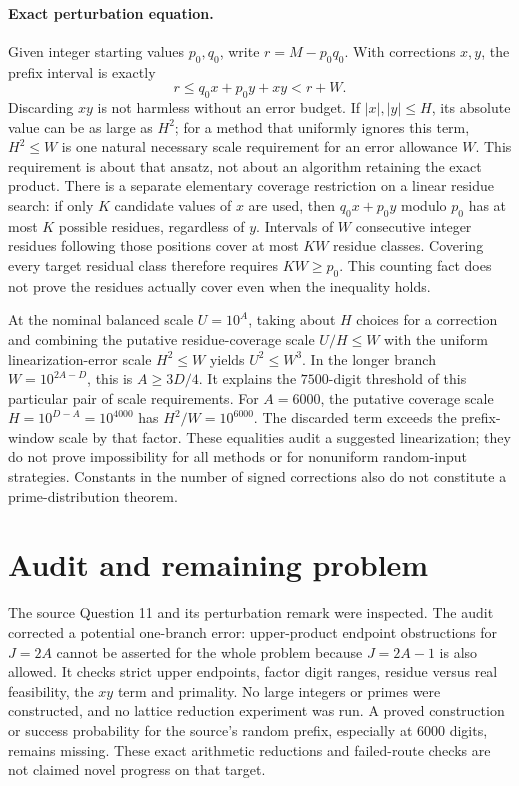 \documentclass[11pt]{article}
\begin{document}
\paragraph{Exact perturbation equation.}
Given integer starting values $p_0,q_0$, write $r=M-p_0q_0$.
With corrections $x,y$, the prefix interval is exactly
\[
r\le q_0x+p_0y+xy<r+W.
\]
Discarding $xy$ is not harmless without an error budget. If
$|x|,|y|\le H$, its absolute value can be as large as $H^2$;
for a method that uniformly ignores this term, $H^2\le W$ is one
natural necessary scale requirement for an error allowance $W$.
This requirement is about that ansatz, not about an algorithm retaining
the exact product.
There is a separate elementary coverage restriction on a linear residue
search: if only $K$ candidate values of $x$ are used, then
$q_0x+p_0y$ modulo $p_0$ has at most $K$ possible residues, regardless
of $y$. Intervals of $W$ consecutive integer residues following those
positions cover at most $KW$ residue classes. Covering every target
residual class therefore requires $KW\ge p_0$.
This counting fact does not prove the residues actually cover even
when the inequality holds.

At the nominal balanced scale $U=10^A$, taking about $H$ choices
for a correction and combining the putative residue-coverage scale
$U/H\le W$ with the uniform linearization-error scale $H^2\le W$ yields
$U^2\le W^3$. In the longer branch $W=10^{2A-D}$, this is
$A\ge3D/4$. It explains the $7500$-digit threshold of this particular
pair of scale requirements. For $A=6000$, the putative coverage scale
$H=10^{D-A}=10^{4000}$ has
$H^2/W=10^{6000}$. The discarded term exceeds the prefix-window scale
by that factor. These equalities audit a suggested linearization;
they do not prove impossibility for all methods or for nonuniform
random-input strategies. Constants in the number of signed corrections
also do not constitute a prime-distribution theorem.

\section{Audit and remaining problem}
The source Question 11 and its perturbation remark were inspected.
The audit corrected a potential one-branch error: upper-product endpoint
obstructions for $J=2A$ cannot be asserted for the whole problem because
$J=2A-1$ is also allowed. It checks strict upper endpoints, factor digit
ranges, residue versus real feasibility, the $xy$ term and primality.
No large integers or primes were constructed, and no lattice reduction
experiment was run. A proved construction or success probability for
the source's random prefix, especially at $6000$ digits, remains missing.
These exact arithmetic reductions and failed-route checks are not
claimed novel progress on that target.
\end{document}
